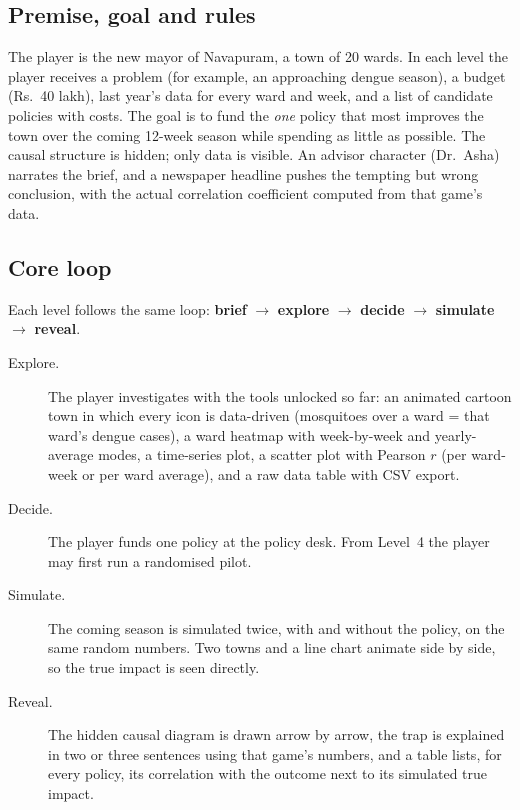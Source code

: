 \documentclass[11pt,a4paper]{article}
\begin{document}
\subsection{Premise, goal and rules}
The player is the new mayor of Navapuram, a town of 20 wards. In each level the player receives a problem (for example,
an approaching dengue season), a budget (Rs.~40 lakh), last year's data for every ward and week, and a list of candidate
policies with costs. The goal is to fund the \emph{one} policy that most improves the town over the coming 12-week season
while spending as little as possible. The causal structure is hidden; only data is visible. An advisor character
(Dr.~Asha) narrates the brief, and a newspaper headline pushes the tempting but wrong conclusion, with the actual
correlation coefficient computed from that game's data.

\subsection{Core loop}
Each level follows the same loop: \textbf{brief} $\rightarrow$ \textbf{explore} $\rightarrow$ \textbf{decide} $\rightarrow$
\textbf{simulate} $\rightarrow$ \textbf{reveal}.
\begin{description}
  \item[Explore.] The player investigates with the tools unlocked so far: an animated cartoon town in which every icon is
  data-driven (mosquitoes over a ward = that ward's dengue cases), a ward heatmap with week-by-week and yearly-average
  modes, a time-series plot, a scatter plot with Pearson $r$ (per ward-week or per ward average), and a raw data table
  with CSV export.
  \item[Decide.] The player funds one policy at the policy desk. From Level~4 the player may first run a randomised pilot.
  \item[Simulate.] The coming season is simulated twice, with and without the policy, on the same random numbers. Two
  towns and a line chart animate side by side, so the true impact is seen directly.
  \item[Reveal.] The hidden causal diagram is drawn arrow by arrow, the trap is explained in two or three sentences using
  that game's numbers, and a table lists, for every policy, its correlation with the outcome next to its simulated true impact.
\end{description}
\end{document}
